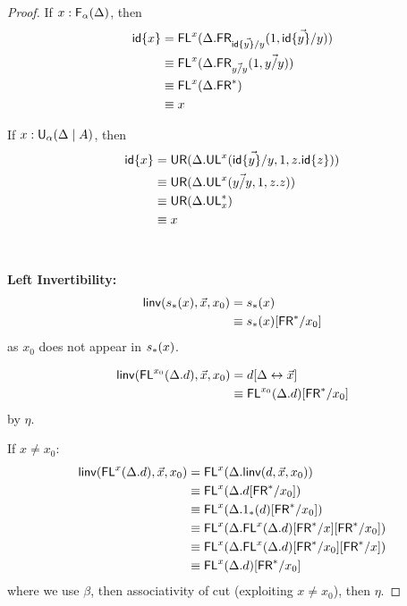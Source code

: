 \begin{proof}
If $x : \mathsf{F}_{\alpha}(\Delta)$, then
\begin{align*}
{\ensuremath{\mathsf{id}}\{x\}} 
&=\mathsf{FL}^{x}(\Delta.\mathsf{FR}_{\vec{{\mathsf{id}\{y\}}/y}}(1,\vec{{\mathsf{id}\{y\}}/y}))\\
&\equiv \mathsf{FL}^{x}(\Delta.\mathsf{FR}_{\vec{y/y}}(1,\vec{y/y}))\\
&\equiv \mathsf{FL}^{x}(\Delta.\mathsf{FR}^*)\\
&\equiv x
\end{align*}

If $x : \mathsf{U}_{\alpha}(\Delta \mid A)$, then
\begin{align*}
{\ensuremath{\mathsf{id}}\{x\}} 
&= \mathsf{UR}(\Delta.\mathsf{UL}^{x}_{}(\vec{{\mathsf{id}\{y\}}/y},1,z.{\mathsf{id}\{z\}}))\\
&\equiv \mathsf{UR}(\Delta.\mathsf{UL}^{x}_{}(\vec{y/y},1,z.z))\\
&\equiv \mathsf{UR}(\Delta.\mathsf{UL}^*_{x})\\
&\equiv x
\end{align*}
\\~\\
\textbf{Left Invertibility:}
\begin{align*}
\mathsf{linv}(s_*(x),\vec{x},x_0) 
&= {s_*(x)} \\
&\equiv s_*(x)[\mathsf{FR}^*/x_0]
\end{align*}
as $x_0$ does not appear in $s_*(x)$.

\begin{align*}
\mathsf{linv}(\mathsf{FL}^{x_0}(\Delta.d),\vec{x},x_0) 
&= d[\Delta \leftrightarrow \vec{x}]\\
&\equiv \mathsf{FL}^{x_0}(\Delta.d)[\mathsf{FR}^*/x_0]
\end{align*}
by $\eta$.

If $x \neq x_0$: \begin{align*}
\mathsf{linv}(\mathsf{FL}^{x}(\Delta.d),\vec{x},x_0) 
&= \mathsf{FL}^{x}(\Delta.\mathsf{linv}(d,\vec{x},x_0)) \\
&\equiv \mathsf{FL}^{x}(\Delta.d[\mathsf{FR}^*/x_0]) \\
&\equiv \mathsf{FL}^{x}(\Delta.1_*(d)[\mathsf{FR}^*/x_0]) \\
&\equiv \mathsf{FL}^{x}(\Delta.\mathsf{FL}^{x}(\Delta.d)[\mathsf{FR}^*/x][\mathsf{FR}^*/x_0]) \\
&\equiv \mathsf{FL}^{x}(\Delta.\mathsf{FL}^{x}(\Delta.d)[\mathsf{FR}^*/x_0][\mathsf{FR}^*/x]) \\
&\equiv \mathsf{FL}^{x}(\Delta.d)[\mathsf{FR}^*/x_0]
\end{align*}
where we use $\beta$, then associativity of cut (exploiting $x \neq x_0$), then $\eta$.


\end{proof}

